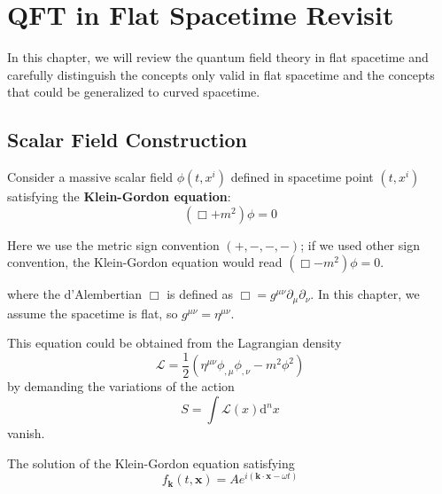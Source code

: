 \documentclass[12pt]{article}
\numberwithin{equation}{subsection}
\theoremstyle{mystyle}{\newtheorem{definition}{Definition}[subsection]}
\theoremstyle{mystyle}{\newtheorem{theorem}[definition]{Theorem}}
\theoremstyle{mystyle}{\newtheorem*{remark}{Remark}}
\theoremstyle{mystyle}{\newtheorem{example}{Example}[subsection]}
\theoremstyle{mystyle}{\newtheorem{examples}{Examples}[subsection]}
\theoremstyle{mystyle}{\newtheorem{cthm}{}[subsection]}
\newcommand{\p}{\partial}
\begin{document}
\newpage





























\section{QFT in Flat Spacetime Revisit}
In this chapter, we will review the quantum field theory in flat spacetime and carefully distinguish
the concepts only valid in flat spacetime and the concepts that could be generalized to curved spacetime.
\subsection{Scalar Field Construction}

Consider a massive scalar field \(\phi(t,x^{i})\) defined in spacetime point \((t,x^{i})\) satisfying the \textbf{Klein-Gordon equation}:
\begin{equation}
  (\Box + m^2) \phi = 0
\end{equation}

\begin{remark}
  Here we use the metric sign convention \((+,-,-,-)\); if we used other sign convention, the Klein-Gordon equation
  would read \((\Box - m^2) \phi = 0\).
\end{remark}

where the d'Alembertian \(\Box\) is defined as \(\Box = g^{\mu\nu}\p_{\mu}\p_{\nu}\).
In this chapter, we assume the spacetime is flat, so \(g^{\mu\nu}=\eta^{\mu\nu}\).\par
This equation could be obtained from the Lagrangian density
\[\mathcal{L} = \frac{1}{2}(\eta^{\mu\nu} \phi_{,\mu} \phi_{,\nu}- m^2 \phi^2)\]
by demanding the variations of the action \[S = \int \mathcal{L}(x) \mathrm{d}^{n}x\] vanish.
\par
The solution of the Klein-Gordon equation satisfying
\[f_{\mathbf{k}}(t,\mathbf{x})= Ae^{i(\mathbf{k}\cdot \mathbf{x}-\omega t)}\]
\end{document}

